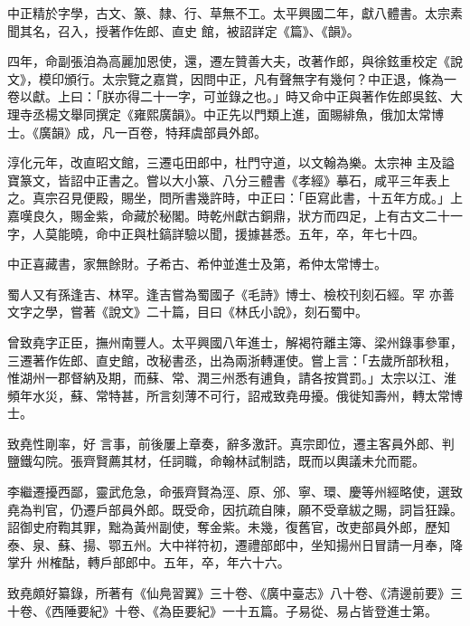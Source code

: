 \begin{pinyinscope}
 中正精於字學，古文、篆、隸、行、草無不工。太平興國二年，獻八體書。太宗素聞其名，召入，授著作佐郎、直史
 館，被詔詳定《篇》、《韻》。



 四年，命副張洎為高麗加恩使，還，遷左贊善大夫，改著作郎，與徐鉉重校定《說文》，模印頒行。太宗覽之嘉賞，因問中正，凡有聲無字有幾何？中正退，條為一卷以獻。上曰：「朕亦得二十一字，可並錄之也。」時又命中正與著作佐郎吳鉉、大理寺丞楊文舉同撰定《雍熙廣韻》。中正先以門類上進，面賜緋魚，俄加太常博士。《廣韻》成，凡一百卷，特拜虞部員外郎。



 淳化元年，改直昭文館，三遷屯田郎中，杜門守道，以文翰為樂。太宗神
 主及謚寶篆文，皆詔中正書之。嘗以大小篆、八分三體書《孝經》摹石，咸平三年表上之。真宗召見便殿，賜坐，問所書幾許時，中正曰：「臣寫此書，十五年方成。」上嘉嘆良久，賜金紫，命藏於秘閣。時乾州獻古銅鼎，狀方而四足，上有古文二十一字，人莫能曉，命中正與杜鎬詳驗以聞，援據甚悉。五年，卒，年七十四。



 中正喜藏書，家無餘財。子希古、希仲並進士及第，希仲太常博士。



 蜀人又有孫逢吉、林罕。逢吉嘗為蜀國子《毛詩》博士、檢校刊刻石經。罕
 亦善文字之學，嘗著《說文》二十篇，目曰《林氏小說》，刻石蜀中。



 曾致堯字正臣，撫州南豐人。太平興國八年進士，解褐符離主簿、梁州錄事參軍，三遷著作佐郎、直史館，改秘書丞，出為兩浙轉運使。嘗上言：「去歲所部秋租，惟湖州一郡督納及期，而蘇、常、潤三州悉有逋負，請各按賞罰。」太宗以江、淮頻年水災，蘇、常特甚，所言刻薄不可行，詔戒致堯毋擾。俄徙知壽州，轉太常博士。



 致堯性剛率，好
 言事，前後屢上章奏，辭多激訐。真宗即位，遷主客員外郎、判鹽鐵勾院。張齊賢薦其材，任詞職，命翰林試制誥，既而以輿議未允而罷。



 李繼遷擾西鄙，靈武危急，命張齊賢為涇、原、邠、寧、環、慶等州經略使，選致堯為判官，仍遷戶部員外郎。既受命，因抗疏自陳，願不受章紱之賜，詞旨狂躁。詔御史府鞫其罪，黜為黃州副使，奪金紫。未幾，復舊官，改吏部員外郎，歷知泰、泉、蘇、揚、鄂五州。大中祥符初，遷禮部郎中，坐知揚州日冒請一月奉，降掌升
 州榷酤，轉戶部郎中。五年，卒，年六十六。



 致堯頗好纂錄，所著有《仙鳧習翼》三十卷、《廣中臺志》八十卷、《清邊前要》三十卷、《西陲要紀》十卷、《為臣要紀》一十五篇。子易從、易占皆登進士第。




\end{pinyinscope}
